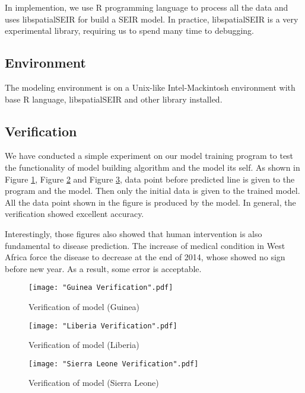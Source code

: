 \documentclass[12pt]{article}
\begin{document}
In implemention, we use R programming language\cite{Rlang} to process all the data and uses libspatialSEIR \cite{libspatialSEIR} for build a SEIR model. In practice, libspatialSEIR is a very experimental library, requiring us to spend many time to debugging.

\subsection{Environment}

The modeling environment is on a Unix-like Intel-Mackintosh environment with base R language, libspatialSEIR and other library installed.

\subsection{Verification}

We have conducted a simple experiment on our model training program to test the functionality of model building algorithm and the model its self. As shown in Figure \ref{GuineaVerification}, Figure \ref{LiberiaVerification} and Figure \ref{SierraLeoneVerification}, data point before predicted line is given to the program and the model. Then only the initial data is given to the trained model. All the data point shown in the figure is produced by the model. In general, the verification showed excellent accuracy.

Interestingly, those figures also showed that human intervention is also fundamental to disease prediction. The increase of medical condition in West Africa force the disease to decrease at the end of 2014, whose showed no sign before new year. As a result, some error is acceptable.

\begin{figure}[htbp]
\centerline{\texttt{[image: "Guinea Verification".pdf]}}
\caption{Verification of model (Guinea)}
\label{GuineaVerification}
\end{figure}

\begin{figure}[htbp]
\centerline{\texttt{[image: "Liberia Verification".pdf]}}
\caption{Verification of model (Liberia)}
\label{LiberiaVerification}
\end{figure}

\begin{figure}[htbp]
\centerline{\texttt{[image: "Sierra Leone Verification".pdf]}}
\caption{Verification of model (Sierra Leone)}
\label{SierraLeoneVerification}
\end{figure}
\end{document}
